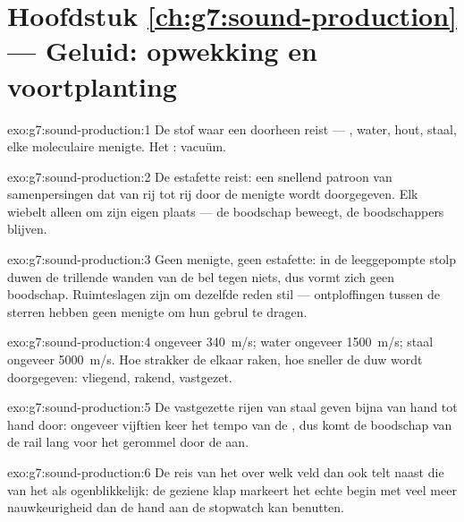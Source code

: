 \section*{Hoofdstuk \ref{ch:g7:sound-production} --- Geluid: opwekking en voortplanting}

\begin{solution}{exo:g7:sound-production:1}
De stof waar een  doorheen reist --- , water, hout,
staal, elke moleculaire menigte. Het : vacuüm.
\end{solution}

\begin{solution}{exo:g7:sound-production:2}
De estafette reist: een snellend patroon van samenpersingen dat van rij
tot rij door de menigte wordt doorgegeven. Elk  wiebelt
alleen om zijn eigen plaats --- de boodschap beweegt, de boodschappers
blijven.
\end{solution}

\begin{solution}{exo:g7:sound-production:3}
Geen menigte, geen estafette: in de leeggepompte stolp duwen de
trillende wanden van de bel tegen niets, dus vormt zich geen boodschap.
Ruimteslagen zijn om dezelfde reden stil --- ontploffingen tussen de
sterren hebben geen menigte om hun gebrul te dragen.
\end{solution}

\begin{solution}{exo:g7:sound-production:4}
 ongeveer \qty{340}{m/s}; water ongeveer \qty{1500}{m/s};
staal ongeveer \qty{5000}{m/s}. Hoe strakker de  elkaar
raken, hoe sneller de duw wordt doorgegeven: vliegend, rakend,
vastgezet.
\end{solution}

\begin{solution}{exo:g7:sound-production:5}
De vastgezette rijen van staal geven bijna van hand tot hand door:
ongeveer vijftien keer het tempo van de , dus komt de
boodschap van de rail lang voor het gerommel door de  aan.
\end{solution}

\begin{solution}{exo:g7:sound-production:6}
De reis van het  over welk veld dan ook telt naast die van het
 als ogenblikkelijk: de geziene klap markeert het echte begin
met veel meer nauwkeurigheid dan de hand aan de stopwatch kan
benutten.
\end{solution}

